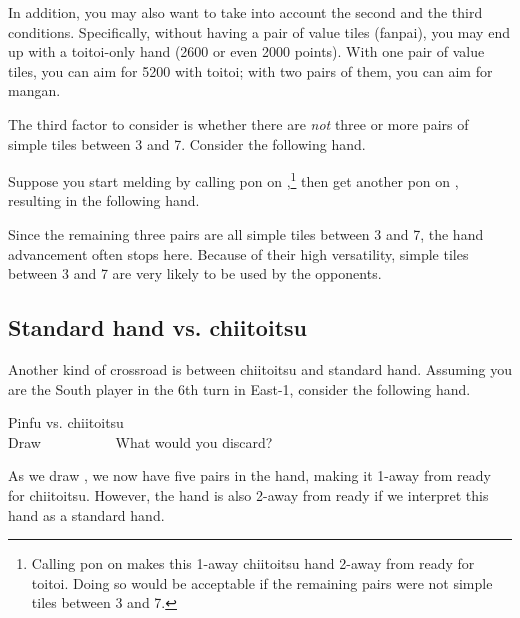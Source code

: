\bigskip
In addition, you may also want to take into account the second and the third conditions. Specifically, without having a pair of value tiles ({\jap fanpai}), you may end up with a {\jap toitoi}-only hand (2600 or even 2000 points). With one pair of value tiles, you can aim for 5200 with {\jap toitoi}; with two pairs of them, you can aim for {\jap mangan}. 

\bigskip
The third factor to consider is whether there are \emph{not} three or more pairs of simple tiles between 3 and 7. Consider the following hand. 
\bp
{}\bai\bai\fa\zhong
\ep

\bigskip
Suppose you start melding by calling {\jap pon} on {\LARGE\bai},\footnote{Calling {\jap pon} on {\bai} makes this 1-away {\jap chiitoitsu} hand 2-away from ready for {\jap toitoi}. Doing so would be acceptable if the remaining pairs were not simple tiles between 3 and 7.} then get another {\jap pon} on {\LARGE{}}, resulting in the following hand.
\bp
{}\zhong~~\bai\rbai\bai
\ep

\bigskip
Since the remaining three pairs are all simple tiles between 3 and 7, the hand advancement often stops here. Because of their high versatility, simple tiles between 3 and 7 are very likely to be used by the opponents. 

\bigskip
\subsection{Standard hand vs. {\jap chiitoitsu}}
Another kind of crossroad is between {\jap chiitoitsu} and standard hand. Assuming you are the South player in the 6th turn in East-1, consider the following hand. 
\bigskip
\begin{itembox}[r]{{\jap Pinfu} vs. {\jap chiitoitsu}}
\bp
{}\bei\bei~\\
\hfill\footnotesize{Draw~~~~~~~~~~}
\ep
\vspace{-17pt}What would you discard? \vspace{-5pt}
\end{itembox}

\bigskip
As we draw {\LARGE{}}, we now have five pairs in the hand, making it 1-away from ready for {\jap chiitoitsu}. However, the hand is also 2-away from ready if we interpret this hand as a standard hand. 

